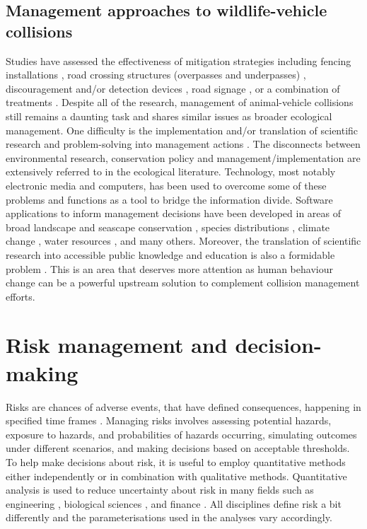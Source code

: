 \subsection{Management approaches to wildlife-vehicle collisions}

Studies have assessed the effectiveness of mitigation strategies including fencing installations \citep{clev01,jaeg04}, road crossing structures (overpasses and underpasses) \citep{bond08}, discouragement and/or detection devices \citep{huij03,huij06}, road signage \citep{bond13}, or a combination of treatments \citep{dani98,pola14,romi96}. Despite all of the research, management of animal-vehicle collisions still remains a daunting task and shares similar issues as broader ecological management.  One difficulty is the implementation and/or translation of scientific research and problem-solving into management actions \citep{roux06}.  The disconnects between environmental research, conservation policy and management/implementation are extensively referred to in the ecological literature.  Technology, most notably electronic media and computers, has been used to overcome some of these problems and functions as a tool to bridge the information divide.  Software applications to inform management decisions have been developed in areas of broad landscape and seascape conservation \citep{ball09,watt09}, species distributions \citep{phil06}, climate change \citep{east09}, water resources \citep{liu08}, and many others.  Moreover, the translation of scientific research into accessible public knowledge and education is also a formidable problem \citep{lubc98}.  This is an area that deserves more attention as human behaviour change can be a powerful upstream solution to complement collision management efforts.

\section{Risk management and decision-making}

Risks are chances of adverse events, that have defined consequences, happening in specified time frames \citep{burg05}. Managing risks involves assessing potential hazards, exposure to hazards, and probabilities of hazards occurring, simulating outcomes under different scenarios, and making decisions based on acceptable thresholds. To help make decisions about risk, it is useful to employ quantitative methods either independently or in combination with qualitative methods. Quantitative analysis is used to reduce uncertainty about risk in many fields such as engineering \citep{apos04}, biological sciences \citep{sute16}, and finance \citep{mcne15}.  All disciplines define risk a bit differently and the parameterisations used in the analyses vary accordingly.

